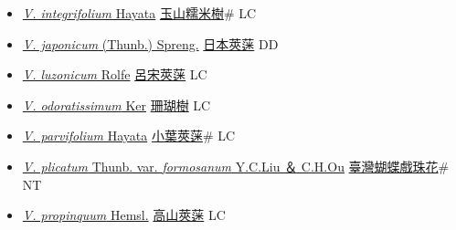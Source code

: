 \begin{itemize}
\begin{itemize}
        \item[] \href{http://www.theplantlist.org/tpl1.1/search?q=Viburnum+integrifolium}{\textit{V. integrifolium} Hayata}   \href{\detokenize{http://taibnet.sinica.edu.tw/chi/taibnet_species_list.php?T2=玉山糯米樹&T2_new_value=true&fr=y}}{玉山糯米樹}\# LC
        \item[] \href{http://www.theplantlist.org/tpl1.1/search?q=Viburnum+japonicum}{\textit{V. japonicum} (Thunb.) Spreng.}   \href{\detokenize{http://taibnet.sinica.edu.tw/chi/taibnet_species_list.php?T2=日本莢蒾&T2_new_value=true&fr=y}}{日本莢蒾} DD
        \item[] \href{http://www.theplantlist.org/tpl1.1/search?q=Viburnum+luzonicum}{\textit{V. luzonicum} Rolfe}   \href{\detokenize{http://taibnet.sinica.edu.tw/chi/taibnet_species_list.php?T2=呂宋莢蒾&T2_new_value=true&fr=y}}{呂宋莢蒾} LC
        \item[] \href{http://www.theplantlist.org/tpl1.1/search?q=Viburnum+odoratissimum}{\textit{V. odoratissimum} Ker}   \href{\detokenize{http://taibnet.sinica.edu.tw/chi/taibnet_species_list.php?T2=珊瑚樹&T2_new_value=true&fr=y}}{珊瑚樹} LC
        \item[] \href{http://www.theplantlist.org/tpl1.1/search?q=Viburnum+parvifolium}{\textit{V. parvifolium} Hayata}   \href{\detokenize{http://taibnet.sinica.edu.tw/chi/taibnet_species_list.php?T2=小葉莢蒾&T2_new_value=true&fr=y}}{小葉莢蒾}\# LC
        \item[] \href{http://www.theplantlist.org/tpl1.1/search?q=Viburnum+plicatum+var.+formosanum}{\textit{V. plicatum} Thunb. var. \textit{formosanum} Y.C.Liu ＆ C.H.Ou}   \href{\detokenize{http://taibnet.sinica.edu.tw/chi/taibnet_species_list.php?T2=臺灣蝴蝶戲珠花&T2_new_value=true&fr=y}}{臺灣蝴蝶戲珠花}\# NT
        \item[] \href{http://www.theplantlist.org/tpl1.1/search?q=Viburnum+propinquum}{\textit{V. propinquum} Hemsl.}   \href{\detokenize{http://taibnet.sinica.edu.tw/chi/taibnet_species_list.php?T2=高山莢蒾&T2_new_value=true&fr=y}}{高山莢蒾} LC

\end{itemize}
\end{itemize}
